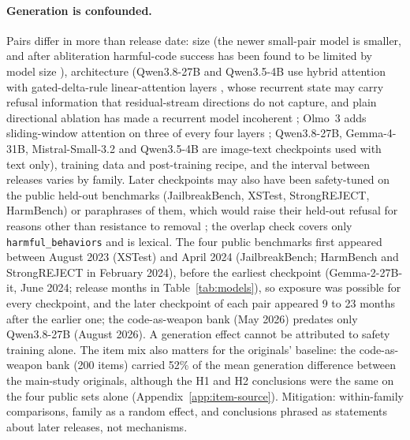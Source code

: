 \paragraph{Generation is confounded.}
Pairs differ in more than release date: size (the newer small-pair model is
smaller, and after abliteration harmful-code success has been found to be
limited by model size \cite{carleo2026willing}), architecture (Qwen3.8-27B and
Qwen3.5-4B use hybrid attention with gated-delta-rule linear-attention layers
\cite{yang2025gated}, whose recurrent state may carry refusal information
that residual-stream directions do not capture, and plain directional ablation has made a
recurrent model incoherent \cite{marshall2024refusal}; Olmo~3 adds
sliding-window attention on three of every four layers \cite{olmo2025olmo3};
Qwen3.8-27B, Gemma-4-31B, Mistral-Small-3.2 and Qwen3.5-4B are image-text checkpoints used with text only), training data and
post-training recipe, and the
interval between releases varies by family. Later checkpoints may also have
been safety-tuned on the public held-out benchmarks (JailbreakBench, XSTest,
StrongREJECT, HarmBench) or paraphrases of them, which would raise their
held-out refusal for reasons other than resistance to removal
\cite{sainz2023nlp}; the overlap check covers only
\texttt{harmful\_behaviors} and is lexical. The four public benchmarks first appeared
between August 2023 (XSTest) and April 2024 (JailbreakBench; HarmBench and
StrongREJECT in February 2024), before the earliest checkpoint
(Gemma-2-27B-it, June 2024; release months in Table~\ref{tab:models}), so
exposure was possible for every checkpoint, and the later checkpoint of each
pair appeared 9 to 23 months after the earlier one; the code-as-weapon bank
(May 2026) predates only Qwen3.8-27B (August 2026). A generation effect cannot be
attributed to safety training alone. The item mix also matters for the
originals' baseline: the code-as-weapon bank (200 items) carried 52\% of the
mean generation difference between the main-study originals, although the H1
and H2 conclusions were the same on the four public sets alone
(Appendix~\ref{app:item-source}). Mitigation: within-family comparisons,
family as a random effect, and conclusions phrased as statements about later
releases, not mechanisms.

